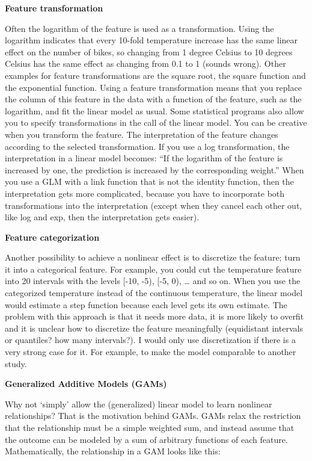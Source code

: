 \documentclass[12pt,]{krantz}
\begin{document}
\textbf{Feature transformation}

Often the logarithm of the feature is used as a transformation. Using
the logarithm indicates that every 10-fold temperature increase has the
same linear effect on the number of bikes, so changing from 1 degree
Celsius to 10 degrees Celsius has the same effect as changing from 0.1
to 1 (sounds wrong). Other examples for feature transformations are the
square root, the square function and the exponential function. Using a
feature transformation means that you replace the column of this feature
in the data with a function of the feature, such as the logarithm, and
fit the linear model as usual. Some statistical programs also allow you
to specify transformations in the call of the linear model. You can be
creative when you transform the feature. The interpretation of the
feature changes according to the selected transformation. If you use a
log transformation, the interpretation in a linear model becomes: ``If
the logarithm of the feature is increased by one, the prediction is
increased by the corresponding weight.'' When you use a GLM with a link
function that is not the identity function, then the interpretation gets
more complicated, because you have to incorporate both transformations
into the interpretation (except when they cancel each other out, like
log and exp, then the interpretation gets easier).

\textbf{Feature categorization}

Another possibility to achieve a nonlinear effect is to discretize the
feature; turn it into a categorical feature. For example, you could cut
the temperature feature into 20 intervals with the levels {[}-10, -5),
{[}-5, 0), \ldots{} and so on. When you use the categorized temperature
instead of the continuous temperature, the linear model would estimate a
step function because each level gets its own estimate. The problem with
this approach is that it needs more data, it is more likely to overfit
and it is unclear how to discretize the feature meaningfully
(equidistant intervals or quantiles? how many intervals?). I would only
use discretization if there is a very strong case for it. For example,
to make the model comparable to another study.

\textbf{Generalized Additive Models (GAMs)}

Why not `simply' allow the (generalized) linear model to learn nonlinear
relationships? That is the motivation behind GAMs. GAMs relax the
restriction that the relationship must be a simple weighted sum, and
instead assume that the outcome can be modeled by a sum of arbitrary
functions of each feature. Mathematically, the relationship in a GAM
looks like this:
\end{document}
